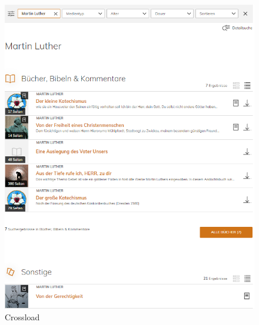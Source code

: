 \begin{figure}
  \begin{centering}
    \includegraphics[width=.8\textwidth]{figures/appendix/crossloadSuche.png}
    \caption{Crossload \cite{pfleiderer2022}}
    \label{fig:crossloadSuche}
  \end{centering}
\end{figure}



